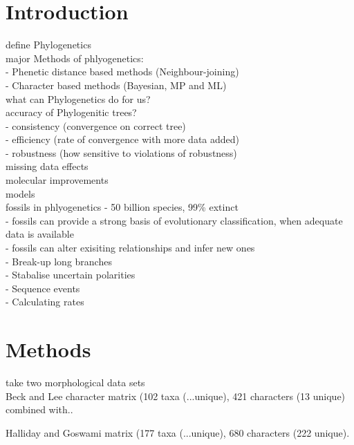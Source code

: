 \documentclass[a4paper,11pt]{article}
\begin{document}
\section{Introduction}

define Phylogenetics\\
major Methods of phlyogenetics:\\ 
 - Phenetic distance based methods (Neighbour-joining)\\
 - Character based methods (Bayesian, MP and ML)\\
what can Phylogenetics do for us?\\

accuracy of Phylogenitic trees?\\
 - consistency (convergence on correct tree)\\
 - efficiency (rate of convergence with more data added)\\
 - robustness (how sensitive to violations of robustness)\\

missing data effects\\

molecular improvements\\

models\\

fossils in phlyogenetics - 50 billion species, 99\% extinct \\
 - fossils can provide a strong basis of evolutionary classification, when adequate data is available \\
 - fossils can alter exisiting relationships and infer new ones\\
 - Break-up long branches\\
 - Stabalise uncertain polarities\\
 - Sequence events\\
 - Calculating rates\\

\section{Methods}

take two morphological data sets \\

Beck and Lee character matrix \citep{beck2014ancient} (102 taxa (...unique), 421 characters (13 unique) combined with..  

Halliday and Goswami matrix \citep{halliday2016eutherian} (177 taxa (...unique), 680 characters (222 unique). 
\end{document}
